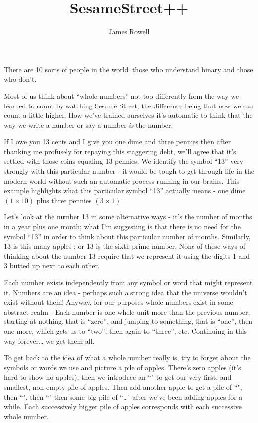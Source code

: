\documentclass{article}
\title{SesameStreet++}
\author{James Rowell}
\begin{document}
\maketitle
\begin{em}
\small{}There are 10 sorts of people in the world: those who understand binary and those who don't.
\end{em}
\normalsize
\bigskip

Most of us think about ``whole numbers'' not too differently from the way
we learned to count by watching Sesame Street,
the difference being that now we can count a little higher.
How we've trained ourselves it's automatic to think that the way
we write a number or say a number \emph{is} the number.

If I owe you 13 cents and I give you one dime and three pennies then 
after thanking me profusely for repaying this staggering debt,
we'll agree that it's settled with those coins equaling 13 pennies. 
We identify the symbol ``13'' very strongly with this particular number - it would 
be tough to get through life in the modern world without such an automatic process
running in our brains. 
This example highlights what this particular symbol ``13'' actually means -
one dime $(1 \times 10)$ plus three pennies $(3 \times 1)$.

Let's look at the number 13 in some alternative ways - it's the 
number of months in a year plus one month;
what I'm suggesting is that there is no need for the symbol ``13'' in order
to think about this particular number of months. Similarly, 13 is this many apples
\faApple{}\faApple{}\faApple{}\faApple{}\faApple{}\faApple{}\faApple{}\faApple{}\faApple{}\faApple{}\faApple{}\faApple{}\faApple{};
or 13 is the sixth prime number. None of these ways of thinking about the number
13 require that we represent it using the digits 1 and 3 butted up next to each other.

Each number exists independently from any symbol or word that might represent it.
Numbers are an idea - perhaps such a strong idea that the universe wouldn't exist without them!
Anyway, for our purposes whole numbers exist in some abstract realm -
Each number is one whole unit more than the previous number,
starting at nothing, that is ``zero'', and jumping to something, that is ``one'',
then one more, which gets us to ``two'',
then again to ``three'', etc. Continuing in this way forever\dots{} we get them all.

To get back to the idea of what a whole number really is,
try to forget about the symbols or words we use and picture a pile of apples.
There's zero apples (it's hard to show no-apples),
then we introduce an ``\faApple{}" to get our very first,
and smallest, non-empty pile of apples.
Then add another apple to get a pile of ``\faApple{}\faApple{}",
then ``\faApple{}\faApple{}\faApple{}",
then ``\faApple{}\faApple{}\faApple{}\faApple{}"
then some big pile of
``\faApple{}\faApple{}\faApple{}\faApple{}\faApple{}\dots{}\faApple{}\faApple{}\faApple{}"
after we've been adding apples for a while.
Each successively bigger pile of apples corresponds with each successive whole number.
\end{document}
